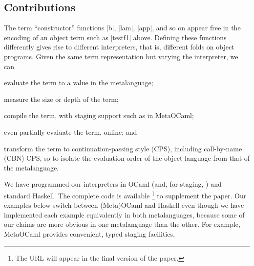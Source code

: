 \documentclass[preprint]{sigplanconf}
\begin{document}
\subsection{Contributions}\label{contributions}

The term ``constructor'' functions |b|, |lam|, |app|, and so on appear
free in the encoding of an object term such as |testf1| above.  Defining
these functions differently gives rise to different interpreters, that
is, different folds on object programs.  Given the same term
representation but varying the interpreter, we can
\begin{itemize*}
    \item evaluate the term to a value in the metalanguage;
    \item measure the size or depth of the term;
    \item compile the term, with staging support such as in MetaOCaml;
    \item even partially evaluate the term, online; and
    \item transform the term to continuation\hyp passing style (CPS),
        including call-by-name (CBN) CPS, so to isolate the evaluation
        order of the object language from that of the metalanguage.
\end{itemize*}
We have programmed our interpreters in OCaml (and, for staging,
\citet{metaocaml}) and standard Haskell. The complete code is available%
\footnote{The URL will appear in the final version of the paper.}
to supplement the paper. Our examples below switch between (Meta)OCaml
and Haskell even though we have implemented each example equivalently in
both metalanguages, because some of our claims are more obvious in one
metalanguage than the other.  For example, MetaOCaml provides
convenient, typed staging facilities.
\end{document}
